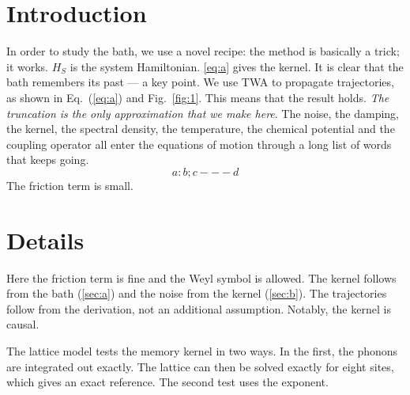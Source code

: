 \documentclass{article}
\begin{document}
\section{Introduction}

In order to study the bath, we use a novel recipe: the method is basically a trick; it works.
$H_S$ is the system Hamiltonian. \cref{eq:a} gives the kernel. It is clear that the bath remembers its past --- a key point.
We use TWA to propagate trajectories, as shown in Eq.~(\ref{eq:a}) and Fig.~\ref{fig:1}.
This means that the result holds. \emph{The truncation is the only approximation that we make here}.
The noise, the damping, the kernel, the spectral density, the temperature, the chemical potential and the coupling operator all enter the equations of motion through a long list of words that keeps going.
\begin{equation}
  a:b ; c --- d \label{eq:a}
\end{equation}
The friction term is small.
\appendix
\section{Details}
Here the friction term is fine and the Weyl symbol is allowed.
The kernel follows from the bath (\cref{sec:a}) and the noise from the kernel (\cref{sec:b}).
The trajectories follow from the derivation, not an additional assumption.
Notably, the kernel is causal.

The lattice model tests the memory kernel in two ways. In the first, the phonons
are integrated out exactly. The lattice can then be solved exactly for eight
sites, which gives an exact reference. The second test uses the exponent.
\end{document}
